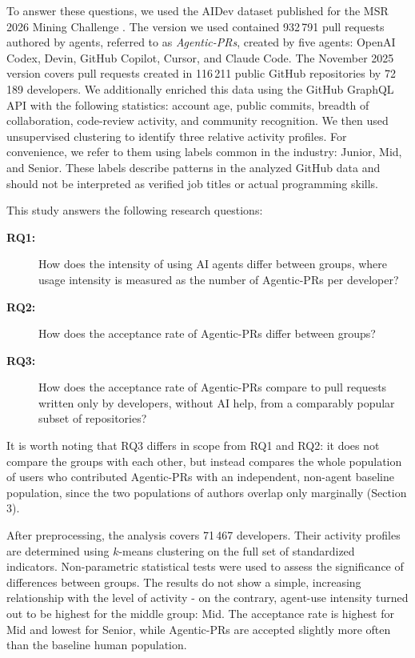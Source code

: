 To answer these questions, we used the AIDev dataset published for the MSR 2026 Mining Challenge \cite{li2026aidev}. The version we used contained 932\,791 pull requests authored by agents, referred to as \emph{Agentic-PRs}, created by five agents: OpenAI Codex, Devin, GitHub Copilot, Cursor, and Claude Code. The November 2025 version covers pull requests created in 116\,211 public GitHub repositories by 72\,189 developers. We additionally enriched this data using the GitHub GraphQL API with the following statistics: account age, public commits, breadth of collaboration, code-review activity, and community recognition. We then used unsupervised clustering to identify three relative activity profiles. For convenience, we refer to them using labels common in the industry: Junior, Mid, and Senior. These labels describe patterns in the analyzed GitHub data and should not be interpreted as verified job titles or actual programming skills.

This study answers the following research questions:

\begin{description}
    \item[\textbf{RQ1:}] How does the intensity of using AI agents differ between groups, where usage intensity is measured as the number of Agentic-PRs per developer?

    \item[\textbf{RQ2:}] How does the acceptance rate of Agentic-PRs differ between groups?

    \item[\textbf{RQ3:}] How does the acceptance rate of Agentic-PRs compare to pull requests written only by developers, without AI help, from a comparably popular subset of repositories?
\end{description}

It is worth noting that RQ3 differs in scope from RQ1 and RQ2: it does not compare the groups with each other, but instead compares the whole population of users who contributed Agentic-PRs with an independent, non-agent baseline population, since the two populations of authors overlap only marginally (Section 3).

After preprocessing, the analysis covers 71\,467 developers. Their activity profiles are determined using $k$-means clustering on the full set of standardized indicators. Non-parametric statistical tests were used to assess the significance of differences between groups. The results do not show a simple, increasing relationship with the level of activity - on the contrary, agent-use intensity turned out to be highest for the middle group: Mid. The acceptance rate is highest for Mid and lowest for Senior, while Agentic-PRs are accepted slightly more often than the baseline human population.

